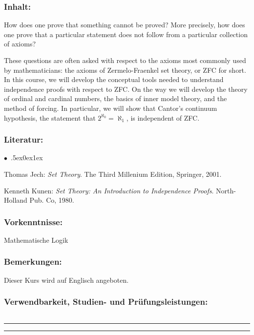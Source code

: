\documentclass[a4paper,10pt]{article}
\renewenvironment{itemize}{\begin{list}{$\bullet$\ }{\itemsep.5ex\setlength{\topsep}{0.5\itemsep}\parsep0ex\labelsep1ex\settowidth{\labelwidth}{$\bullet$\ }\setlength{\leftmargin}{\labelwidth}\addtolength{\leftmargin}{3ex}\addtolength{\leftmargin}{\labelsep}}}{\end{list}}
\begin{document}
\subsubsection*{\large
    Inhalt:
}
How does one prove that something cannot be proved? More precisely, how does one prove that a particular statement does not follow from a particular collection of axioms?

These questions are often asked with respect to the axioms most commonly used by mathematicians: the axioms of Zermelo-Fraenkel set theory, or ZFC for short. In this course, we will develop the conceptual tools needed to understand independence proofs with respect to ZFC. On the way we will develop the theory of ordinal and cardinal numbers, the basics of inner model theory, and the method of forcing. In particular, we will show that Cantor's continuum hypothesis, the statement that $2^{\aleph_0}=\aleph_1$, is independent of ZFC. 

\subsubsection*{\large
    Literatur:
}
\begin{itemize}
\item Thomas Jech: \emph{Set Theory}. The Third Millenium Edition, Springer, 2001. 
\item Kenneth Kunen: \emph{Set Theory: An Introduction to Independence Proofs}. North-Holland Pub. Co, 1980.
\end{itemize}

\subsubsection*{\large
    Vorkenntnisse:
}
Mathematische Logik
\subsubsection*{\large
    Bemerkungen:
}
Dieser Kurs wird auf Englisch angeboten.
\subsubsection*{\large
    Verwendbarkeit, Studien- und Prüfungsleistungen:
}

\begin{tabularx}{\textwidth}{ p{}
}
\\[2ex] \hline
\end{tabularx}


\clearpage\hrule\vskip1pt\hrule
\end{document}

